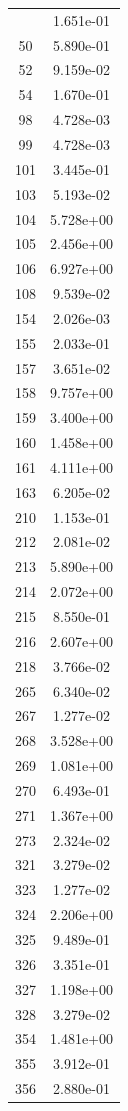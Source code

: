 \documentclass[12pt]{article}
\begin{document}
\begin{longtable}{@{}cc@{}}
\bottomrule
\endlastfoot
2 & 1.651e-01 \\
50 & 5.890e-01 \\
52 & 9.159e-02 \\
54 & 1.670e-01 \\
98 & 4.728e-03 \\
99 & 4.728e-03 \\
101 & 3.445e-01 \\
103 & 5.193e-02 \\
104 & 5.728e+00 \\
105 & 2.456e+00 \\
106 & 6.927e+00 \\
108 & 9.539e-02 \\
154 & 2.026e-03 \\
155 & 2.033e-01 \\
157 & 3.651e-02 \\
158 & 9.757e+00 \\
159 & 3.400e+00 \\
160 & 1.458e+00 \\
161 & 4.111e+00 \\
163 & 6.205e-02 \\
210 & 1.153e-01 \\
212 & 2.081e-02 \\
213 & 5.890e+00 \\
214 & 2.072e+00 \\
215 & 8.550e-01 \\
216 & 2.607e+00 \\
218 & 3.766e-02 \\
265 & 6.340e-02 \\
267 & 1.277e-02 \\
268 & 3.528e+00 \\
269 & 1.081e+00 \\
270 & 6.493e-01 \\
271 & 1.367e+00 \\
273 & 2.324e-02 \\
321 & 3.279e-02 \\
323 & 1.277e-02 \\
324 & 2.206e+00 \\
325 & 9.489e-01 \\
326 & 3.351e-01 \\
327 & 1.198e+00 \\
328 & 3.279e-02 \\
354 & 1.481e+00 \\
355 & 3.912e-01 \\
356 & 2.880e-01 \\

\bottomrule
\end{longtable}
\end{document}
